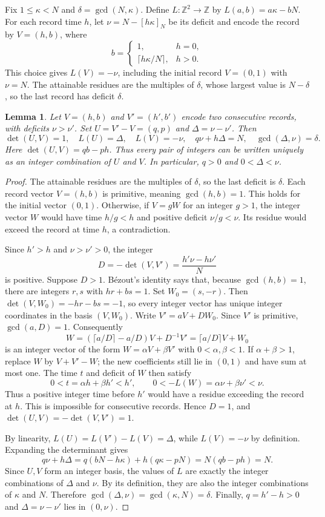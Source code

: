 \documentclass[11pt,a4paper]{article}
\newtheorem{lemma}[theorem]{Lemma}
\theoremstyle{definition}
\theoremstyle{remark}
\numberwithin{equation}{section}
\begin{document}
Fix $1\le\kappa<N$ and $\delta=\gcd(N,\kappa)$. Define $L:\mathbb Z^2\to\mathbb Z$ by $L(a,b)=a\kappa-bN$. For each record time $h$, let $\nu=N-[h\kappa]_N$ be its deficit and encode the record by $V=(h,b)$, where
\[
 b=\begin{cases}
 1,&h=0,\\
 \lceil h\kappa/N\rceil,&h>0.
 \end{cases}
\]
This choice gives $L(V)=-\nu$, including the initial record $V=(0,1)$ with $\nu=N$. The attainable residues are the multiples of $\delta$, whose largest value is $N-\delta$, so the last record has deficit $\delta$.

\begin{lemma}\label{lem:record-basis}
Let $V=(h,b)$ and $V'=(h',b')$ encode two consecutive records, with deficits $\nu>\nu'$. Set $U=V'-V=(q,p)$ and $\Delta=\nu-\nu'$. Then
\begin{equation}\label{eq:record-basis}
 \det(U,V)=1,\quad L(U)=\Delta,\quad L(V)=-\nu,
 \quad q\nu+h\Delta=N,\quad \gcd(\Delta,\nu)=\delta.
\end{equation}
Here $\det(U,V)=qb-ph$. Thus every pair of integers can be written uniquely as an integer combination of $U$ and $V$. In particular, $q>0$ and $0<\Delta<\nu$.
\end{lemma}
\begin{proof}
The attainable residues are the multiples of $\delta$, so the last deficit is $\delta$. Each record vector $V=(h,b)$ is primitive, meaning $\gcd(h,b)=1$. This holds for the initial vector $(0,1)$. Otherwise, if $V=gW$ for an integer $g>1$, the integer vector $W$ would have time $h/g<h$ and positive deficit $\nu/g<\nu$. Its residue would exceed the record at time $h$, a contradiction.

Since $h'>h$ and $\nu>\nu'>0$, the integer
\[
 D=-\det(V,V')=\frac{h'\nu-h\nu'}{N}
\]
is positive. Suppose $D>1$. B\'ezout's identity says that, because $\gcd(h,b)=1$, there are integers $r,s$ with $hr+bs=1$. Set $W_0=(s,-r)$. Then $\det(V,W_0)=-hr-bs=-1$, so every integer vector has unique integer coordinates in the basis $(V,W_0)$. Write $V'=aV+DW_0$. Since $V'$ is primitive, $\gcd(a,D)=1$. Consequently
\[
 W=\left(\lceil a/D\rceil-a/D\right)V+D^{-1}V'
   =\lceil a/D\rceil V+W_0
\]
is an integer vector of the form $W=\alpha V+\beta V'$ with $0<\alpha,\beta<1$. If $\alpha+\beta>1$, replace $W$ by $V+V'-W$; the new coefficients still lie in $(0,1)$ and have sum at most one. The time $t$ and deficit of $W$ then satisfy
\[
 0<t=\alpha h+\beta h'<h',\qquad
 0<-L(W)=\alpha\nu+\beta\nu'<\nu.
\]
Thus a positive integer time before $h'$ would have a residue exceeding the record at $h$. This is impossible for consecutive records. Hence $D=1$, and $\det(U,V)=-\det(V,V')=1$.

By linearity, $L(U)=L(V')-L(V)=\Delta$, while $L(V)=-\nu$ by definition. Expanding the determinant gives
\[
 q\nu+h\Delta
 =q(bN-h\kappa)+h(q\kappa-pN)
 =N(qb-ph)=N.
\]
Since $U,V$ form an integer basis, the values of $L$ are exactly the integer combinations of $\Delta$ and $\nu$. By its definition, they are also the integer combinations of $\kappa$ and $N$. Therefore $\gcd(\Delta,\nu)=\gcd(\kappa,N)=\delta$. Finally, $q=h'-h>0$ and $\Delta=\nu-\nu'$ lies in $(0,\nu)$.
\end{proof}
\end{document}
